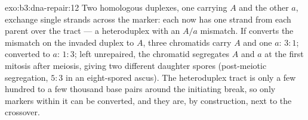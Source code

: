 \begin{solution}{exo:b3:dna-repair:12}
Two homologous duplexes, one carrying $A$ and the other $a$, exchange
single strands across the marker: each now has one strand from each
parent over the tract --- a heteroduplex with an $A/a$ mismatch. If
 converts the mismatch on the invaded duplex to $A$,
three chromatids carry $A$ and one $a$: $3{:}1$; converted to $a$:
$1{:}3$; left unrepaired, the chromatid segregates $A$ and $a$ at the
first mitosis after meiosis, giving two different daughter spores
(post-meiotic segregation, $5{:}3$ in an eight-spored ascus). The
heteroduplex tract is only a few hundred to a few thousand base pairs
around the initiating break, so only markers within it can be
converted, and they are, by construction, next to the crossover.
\end{solution}

